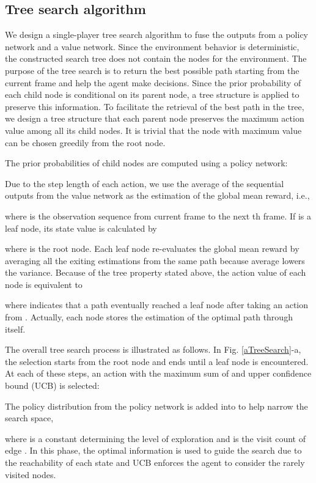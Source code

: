 \documentclass[letterpaper, 10 pt, conference]{ieeeconf}
\begin{document}
\subsection{Tree search algorithm}
We design a single-player tree search algorithm to fuse the outputs from a policy network and a value network. Since the environment behavior is deterministic, the constructed search tree does not contain the nodes for the environment. The purpose of the tree search is to return the best possible path starting from the current frame and help the agent make decisions.  
Since the prior probability of each child node is conditional on its parent node, a tree structure is applied to preserve this information. To facilitate the retrieval of the best path in the tree, we design a tree structure that each parent node preserves the maximum action value among all its child nodes. It is trivial that the node with maximum value can be chosen greedily from the root node.

The prior probabilities of child nodes are computed using a policy network:

Due to the step length  of each action, we use the average of the  sequential outputs from the value network  as the estimation of the global mean reward, i.e.,
 
where  is the observation sequence from current frame to the next th frame.
If  is a leaf node, its state value is calculated by 

where  is the root node. Each leaf node re-evaluates the global mean reward by averaging all the exiting estimations from the same path because average lowers the variance. Because of the tree property stated above, the action value of each node is equivalent to

where  indicates that a path eventually reached a leaf node  after taking an action  from . Actually, each node stores the estimation of the optimal path through itself.

The overall tree search process is illustrated as follows. In Fig. \ref{aTreeSearch}-a, the selection starts from the root node  and ends until a leaf node  is encountered. At each of these steps, an action with the maximum sum of  and upper confidence bound (UCB) is selected: 


The policy distribution from the policy network is added into  to help narrow the search space,

where  is a constant determining the level of exploration and  is the visit count of edge . In this phase, the optimal information is used to guide the search due to the reachability of each state and UCB enforces the agent to consider the rarely visited nodes. 
\end{document}
